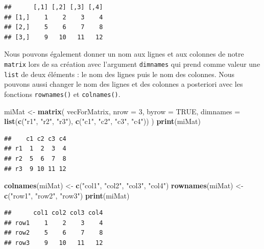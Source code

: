 \documentclass[]{book}
\newenvironment{Shaded}{\begin{snugshade}}{\end{snugshade}}
\newcommand{\KeywordTok}[1]{\textcolor[rgb]{0.13,0.29,0.53}{\textbf{#1}}}
\newcommand{\DataTypeTok}[1]{\textcolor[rgb]{0.13,0.29,0.53}{#1}}
\newcommand{\DecValTok}[1]{\textcolor[rgb]{0.00,0.00,0.81}{#1}}
\newcommand{\StringTok}[1]{\textcolor[rgb]{0.31,0.60,0.02}{#1}}
\newcommand{\OtherTok}[1]{\textcolor[rgb]{0.56,0.35,0.01}{#1}}
\newcommand{\NormalTok}[1]{#1}
\begin{document}
\begin{verbatim}
##      [,1] [,2] [,3] [,4]
## [1,]    1    2    3    4
## [2,]    5    6    7    8
## [3,]    9   10   11   12
\end{verbatim}

Nous pouvons également donner un nom aux lignes et aux colonnes de notre
\texttt{matrix} lors de sa création avec l'argument \texttt{dimnames}
qui prend comme valeur une \texttt{list} de deux éléments : le nom des
lignes puis le nom des colonnes. Nous pouvons aussi changer le nom des
lignes et des colonnes a posteriori avec les fonctions
\texttt{rownames()} et \texttt{colnames()}.

\begin{Shaded}
\begin{Highlighting}[]
\NormalTok{miMat <-}\StringTok{ }\KeywordTok{matrix}\NormalTok{(}
\NormalTok{  vecForMatrix, }
  \DataTypeTok{nrow =} \DecValTok{3}\NormalTok{, }
  \DataTypeTok{byrow =} \OtherTok{TRUE}\NormalTok{, }
  \DataTypeTok{dimnames =} \KeywordTok{list}\NormalTok{(}\KeywordTok{c}\NormalTok{(}\StringTok{"r1"}\NormalTok{, }\StringTok{"r2"}\NormalTok{, }\StringTok{"r3"}\NormalTok{), }\KeywordTok{c}\NormalTok{(}\StringTok{"c1"}\NormalTok{, }\StringTok{"c2"}\NormalTok{, }\StringTok{"c3"}\NormalTok{, }\StringTok{"c4"}\NormalTok{))}
\NormalTok{)}
\KeywordTok{print}\NormalTok{(miMat)}
\end{Highlighting}
\end{Shaded}

\begin{verbatim}
##    c1 c2 c3 c4
## r1  1  2  3  4
## r2  5  6  7  8
## r3  9 10 11 12
\end{verbatim}

\begin{Shaded}
\begin{Highlighting}[]
\KeywordTok{colnames}\NormalTok{(miMat) <-}\StringTok{ }\KeywordTok{c}\NormalTok{(}\StringTok{"col1"}\NormalTok{, }\StringTok{"col2"}\NormalTok{, }\StringTok{"col3"}\NormalTok{, }\StringTok{"col4"}\NormalTok{)}
\KeywordTok{rownames}\NormalTok{(miMat) <-}\StringTok{ }\KeywordTok{c}\NormalTok{(}\StringTok{"row1"}\NormalTok{, }\StringTok{"row2"}\NormalTok{, }\StringTok{"row3"}\NormalTok{)}
\KeywordTok{print}\NormalTok{(miMat)}
\end{Highlighting}
\end{Shaded}

\begin{verbatim}
##      col1 col2 col3 col4
## row1    1    2    3    4
## row2    5    6    7    8
## row3    9   10   11   12
\end{verbatim}
\end{document}
